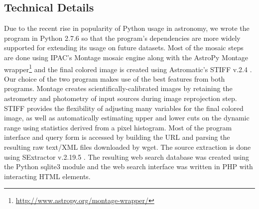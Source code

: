 \documentclass[5p]{elsarticle}
\begin{document}
		\subsection{Technical Details}
		Due to the recent rise in popularity of Python usage in astronomy, we wrote the program in Python 2.7.6 so that the program's dependencies are more widely supported for extending its usage on future datasets. Most of the mosaic steps are done using IPAC's Montage  \cite{montage} mosaic engine along with the AstroPy Montage wrapper\footnote{\url{http://www.astropy.org/montage-wrapper/}} and the final colored image is created using Astromatic's STIFF v.2.4 \cite{stiff}. Our choice of the two program makes use of the best features from both programs. Montage creates scientifically-calibrated images by retaining the astrometry and photometry of input sources during image reprojection step. STIFF provides the flexibility of adjusting many variables for the final colored image, as well as automatically estimating upper and lower cuts on the dynamic range using statistics derived from a pixel histogram.  %
Most of the program interface and query form is accessed by building the URL and parsing the resulting raw text/XML files downloaded by wget.
The source extraction is done using SExtractor v.2.19.5 \cite{sextractor}. The resulting web search %
database was created using the Python sqlite3 module and the web search interface was written in PHP with interacting HTML elements.
\end{document}
